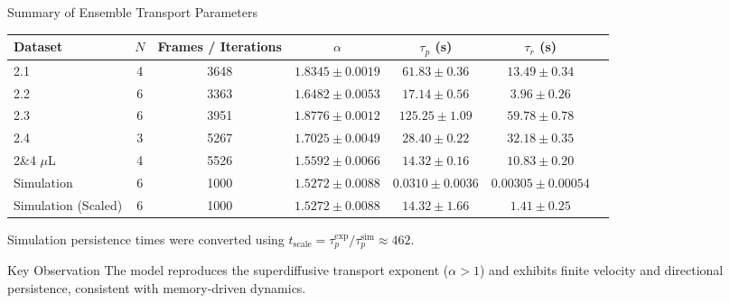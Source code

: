 \begin{frame}{Summary of Ensemble Transport Parameters}

	\centering
	\scriptsize

	\begin{table}
		\centering
		\begin{tabular}{lcccccc}
			\toprule
			Dataset      &
			$N$          &
			Frames /
			Iterations   &
			$\alpha$     &
			$\tau_p$ (s) &
			$\tau_r$ (s)                         \\
			\midrule

			2.1
			             & 4
			             & 3648
			             & $1.8345 \pm 0.0019$
			             & $61.83 \pm 0.36$
			             & $13.49 \pm 0.34$
			\\

			2.2
			             & 6
			             & 3363
			             & $1.6482 \pm 0.0053$
			             & $17.14 \pm 0.56$
			             & $3.96 \pm 0.26$
			\\

			2.3
			             & 6
			             & 3951
			             & $1.8776 \pm 0.0012$
			             & $125.25 \pm 1.09$
			             & $59.78 \pm 0.78$
			\\

			2.4
			             & 3
			             & 5267
			             & $1.7025 \pm 0.0049$
			             & $28.40 \pm 0.22$
			             & $32.18 \pm 0.35$
			\\

			2\&4 $\mu$L
			             & 4
			             & 5526
			             & $1.5592 \pm 0.0066$
			             & $14.32 \pm 0.16$
			             & $10.83 \pm 0.20$
			\\

			\midrule

			Simulation
			             & 6
			             & 1000
			             & $1.5272 \pm 0.0088$
			             & $0.0310 \pm 0.0036$
			             & $0.00305 \pm 0.00054$
			\\

			Simulation (Scaled)
			             & 6
			             & 1000
			             & $1.5272 \pm 0.0088$
			             & $14.32 \pm 1.66$
			             & $1.41 \pm 0.25$
			\\

			\bottomrule
		\end{tabular}
	\end{table}

	\vspace{0.2cm}

	{\tiny
		Simulation persistence times were converted using
		$t_{\mathrm{scale}}
			=
			\tau_p^{\mathrm{exp}}
			/
			\tau_p^{\mathrm{sim}}
			\approx 462$.
	}

	\begin{alertblock}{Key Observation}
		The model reproduces the superdiffusive transport exponent
		($\alpha>1$) and exhibits finite velocity and directional persistence,
		consistent with memory-driven dynamics.
	\end{alertblock}

\end{frame}

